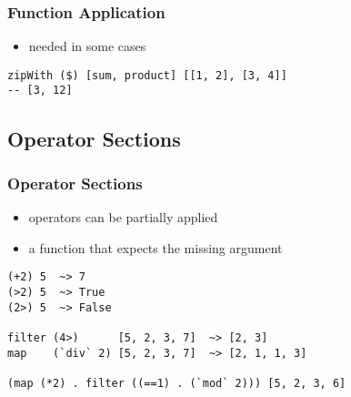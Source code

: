 \documentclass[dvipsnames]{beamer}
\theoremstyle{plain}
\begin{document}
\begin{frame}[fragile]
  \frametitle{Function Application}

  \begin{itemize}
    \item needed in some cases
  \end{itemize}

  \begin{exampleblock}{}
    \begin{lstlisting}
zipWith ($) [sum, product] [[1, 2], [3, 4]]
-- [3, 12]
    \end{lstlisting}
  \end{exampleblock}
\end{frame}

\subsection{Operator Sections}

\begin{frame}[fragile]
  \frametitle{Operator Sections}

  \begin{itemize}
    \item operators can be partially applied
    \item a function that expects the missing argument
  \end{itemize}

  \begin{exampleblock}{}
    \begin{lstlisting}
(+2) 5  ~> 7
(>2) 5  ~> True
(2>) 5  ~> False

filter (4>)      [5, 2, 3, 7]  ~> [2, 3]
map    (`div` 2) [5, 2, 3, 7]  ~> [2, 1, 1, 3]

(map (*2) . filter ((==1) . (`mod` 2))) [5, 2, 3, 6]
    \end{lstlisting}
  \end{exampleblock}
\end{frame}


%
%
%
\end{document}
